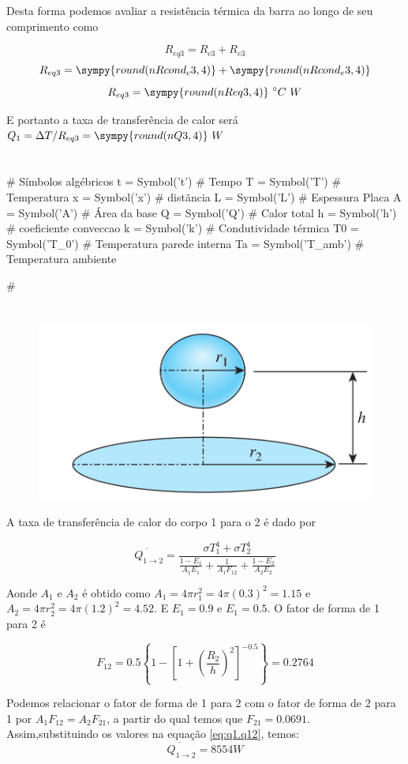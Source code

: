 \documentclass[a4paper,11pt]{article}
\newcommand{\npy}[1]{\sympy{round(n#1,4)}}
\begin{document}
Desta forma podemos avaliar a resistência térmica da barra ao longo de seu comprimento como

$$R_{eq3} = R_{c3} + R_{e3}$$
$$R_{eq3} = \npy{Rcond_c3} + \npy{Rcond_e3}$$
$$R_{eq3} = \npy{Req3}\ ^\circ C\ W$$

E portanto a taxa de transferência de calor será $Q_1 = \Delta T/R_{eq3} = \npy{Q3}\ W$


\section{} %
\begin{sympycode}
# Símbolos algébricos
t = Symbol('t') # Tempo
T = Symbol('T') # Temperatura
x = Symbol('x') # distãncia
L = Symbol('L') # Espessura Placa
A = Symbol('A') # Área da base
Q = Symbol('Q') # Calor total
h = Symbol('h') # coeficiente conveccao
k = Symbol('k') # Condutividade térmica
T0 = Symbol('T_0') # Temperatura parede interna
Ta = Symbol('T_amb') # Temperatura ambiente

#

\end{sympycode}


\section{} %

\begin{figure}[H]
\centering
\includegraphics[width = 0.6\linewidth]{./image/lista1/q15}
\end{figure}

A taxa de transferência de calor do corpo 1 para o 2 é dado por

\begin{equation}\label{eq:q1.q12}
\dot{Q_{1\to 2}} = \frac{\sigma T_1^4 + \sigma T_2^4}{\frac{1-E_1}{A_1 E_1} + \frac{1}{A_1 F_{12}} + \frac{1-E_2}{A_2 E_2}}
\end{equation}

Aonde $A_1$ e $A_2$ é obtido como $A_1 = 4\pi r_1^2 = 4\pi (0.3)^2 = 1.15$ e $A_2 = 4\pi r_2^2 = 4\pi (1.2)^2 = 4.52$. E $E_1 = 0.9$ e $E_1 = 0.5$. O fator de forma de 1 para 2 é

$$
F_{12} = 0.5\left\{ 1 - \left[1 + \left(\frac{R_2}{h}\right)^2 \right]^{-0.5}\right\} = 0.2764
$$

Podemos relacionar o fator de forma de 1 para 2 com o fator de forma de 2 para 1 por $A_1F_{12} = A_2F_{21}$, a partir do qual temos que $F_{21} = 0.0691$. Assim,substituindo os valores na equação \ref{eq:q1.q12}, temos:
$$
\dot{Q_{1\to 2}} = 8554 W
$$
\end{document}
